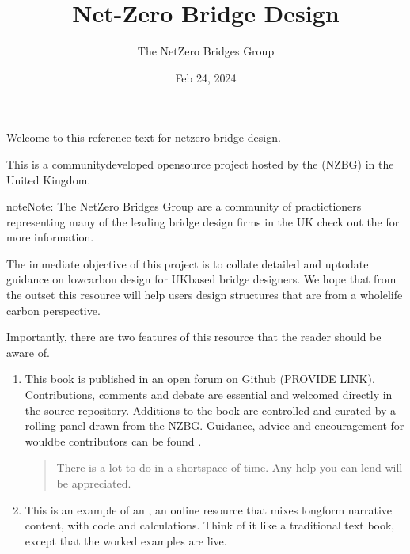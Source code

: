 \documentclass[letterpaper,10pt,english]{jupyterBook}
\title{Net-Zero Bridge Design}
\date{Feb 24, 2024}
\author{The Net\sphinxhyphen{}Zero Bridges Group}
\begin{document}
\pagestyle{empty}
\sphinxmaketitle
\pagestyle{plain}
\sphinxtableofcontents
\pagestyle{normal}
\label{\detokenize{intro::doc}}


\sphinxAtStartPar
Welcome to this reference text for net\sphinxhyphen{}zero bridge design.

\sphinxAtStartPar
This is a community\sphinxhyphen{}developed open\sphinxhyphen{}source project hosted by the {\hyperref[\detokenize{part5/glossary:term-Net-Zero-Bridges-Group}]{}} (NZBG) in the United Kingdom.

\begin{sphinxadmonition}{note}{Note:}
\sphinxAtStartPar
The Net\sphinxhyphen{}Zero Bridges Group are a community of practictioners representing many of the leading bridge design firms in the UK \sphinxhyphen{} check out the  for more information.
\end{sphinxadmonition}

\sphinxAtStartPar
The immediate objective of this project is to collate detailed and up\sphinxhyphen{}to\sphinxhyphen{}date guidance on low\sphinxhyphen{}carbon design for UK\sphinxhyphen{}based bridge designers. We hope that from the outset this resource will help users design structures that are  from a whole\sphinxhyphen{}life carbon perspective.

\sphinxAtStartPar
Importantly, there are two features of this resource that the reader should be aware of.
\begin{enumerate}
%
\item {} 
\sphinxAtStartPar
This book is published in an open forum on Github (PROVIDE LINK). Contributions, comments and debate are essential and welcomed  directly in the source repository. Additions to the book are controlled and curated by a rolling panel drawn from the NZBG. Guidance, advice and encouragement for would\sphinxhyphen{}be contributors can be found {\hyperref[\detokenize{part5/community_contribution::doc}]{}}.
\begin{quote}

\sphinxAtStartPar
There is a lot to do in a short\sphinxhyphen{}space of time. Any help you can lend will be appreciated.
\end{quote}

\item {} 
\sphinxAtStartPar
This is an example of an , an online resource that mixes long\sphinxhyphen{}form narrative content, with code and calculations. Think of it like a traditional text book, except that the worked examples are live.

\end{enumerate}
\end{document}
